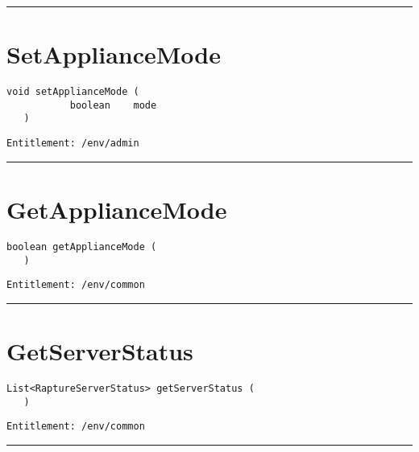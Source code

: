 \rule{12cm}{2pt}
\section{SetApplianceMode}
\label{Api:SetApplianceMode}
\begin{lstlisting}[style=nonumbers]
   void setApplianceMode (
           boolean    mode
   )
\end{lstlisting}
\begin{Verbatim}[formatcom=\color{Maroon}]
  Entitlement: /env/admin
\end{Verbatim}



\rule{12cm}{2pt}
\section{GetApplianceMode}
\label{Api:GetApplianceMode}
\begin{lstlisting}[style=nonumbers]
   boolean getApplianceMode (
   )
\end{lstlisting}
\begin{Verbatim}[formatcom=\color{Maroon}]
  Entitlement: /env/common
\end{Verbatim}



\rule{12cm}{2pt}
\section{GetServerStatus}
\label{Api:GetServerStatus}
\begin{lstlisting}[style=nonumbers]
   List<RaptureServerStatus> getServerStatus (
   )
\end{lstlisting}
\begin{Verbatim}[formatcom=\color{Maroon}]
  Entitlement: /env/common
\end{Verbatim}



\rule{12cm}{2pt}
